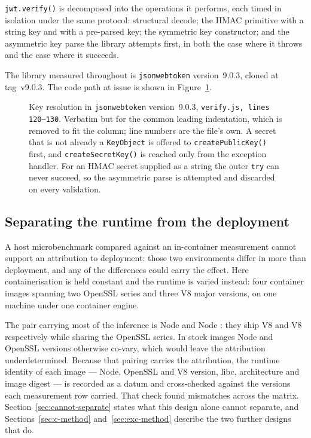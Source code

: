 \documentclass[pdflatex,sn-basic,twocolumn]{sn-jnl}%
\newcommand{\LibraryName}{\texttt{jsonwebtoken}}
\newcommand{\LibraryVersion}{version~9.0.3}
\newcommand{\LibraryTag}{tag~v9.0.3}
\newcommand{\CodeFileLines}{verify.js, lines 120--130}
\newcommand{\CodeFirstLine}{120}
\begin{document}
\texttt{jwt.verify()} is decomposed into the operations it performs, each timed
in isolation under the same protocol: structural decode; the HMAC primitive with
a string key and with a pre-parsed key; the symmetric key constructor; and the
asymmetric key parse the library attempts first, in both the case where it
throws and the case where it succeeds.

The library measured throughout is \LibraryName{} \LibraryVersion{}, cloned at
\LibraryTag. The code path at issue is shown in Figure~\ref{fig:codepath}.

\begin{figure}[!htbp]

\caption{Key resolution in \LibraryName{} \LibraryVersion{},
\texttt{\CodeFileLines}. Verbatim but for the common leading indentation,
which is removed to fit the column; line numbers are the file's own. A secret
that is not already a \texttt{KeyObject} is offered to
\texttt{createPublicKey()} first, and \texttt{createSecretKey()} is reached only
from the exception handler. For an HMAC secret supplied as a string the outer
\texttt{try} can never succeed, so the asymmetric parse is attempted and
discarded on every validation.}
\label{fig:codepath}
\end{figure}

\subsection{Separating the runtime from the deployment}\label{sec:matrix-method}

A host microbenchmark compared against an in-container measurement cannot
support an attribution to deployment: those two environments differ in more than
deployment, and any of the differences could carry the effect. Here
containerisation is held constant and the runtime is varied instead:
four container images spanning two OpenSSL series and three V8 major versions,
on one machine under one container engine.

The pair carrying most of the inference is Node \NodeEighteenNodeMajor{} and
Node \NodeTwentyNodeMajor: they ship V8 \NodeEighteenVeight{} and V8
\NodeTwentyVeight{} respectively while sharing the OpenSSL
\NodeEighteenOpensslSeries{} series. In stock images Node and OpenSSL versions
otherwise co-vary, which would leave the attribution underdetermined. Because
that pairing carries the attribution, the runtime identity of each image ---
Node, OpenSSL and V8 version, libc, architecture and image digest --- is
recorded as a datum and cross-checked against the versions each measurement row
carried. That check found \IdentityMismatches{} mismatches across the matrix.
Section~\ref{sec:cannot-separate} states what this design alone cannot
separate, and Sections~\ref{sec:c-method} and~\ref{sec:exc-method} describe the
two further designs that do.
\end{document}
